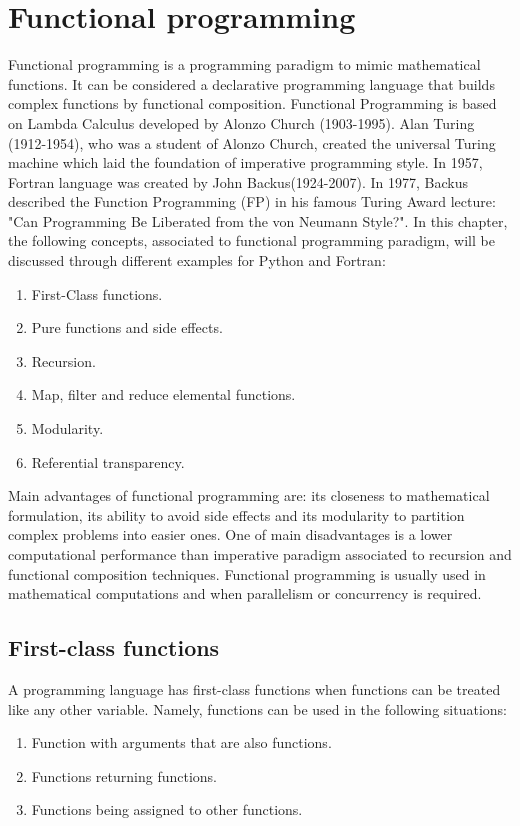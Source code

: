 \chapter{Functional programming} 
\vspace{-1cm}
Functional programming is a programming paradigm 
to mimic mathematical functions. 
It can be considered a declarative programming language 
that builds complex functions by functional composition. 
Functional Programming is based on Lambda Calculus developed 
by Alonzo Church (1903-1995). 
Alan Turing (1912-1954), who was a student of Alonzo Church, created the 
universal Turing machine which laid the foundation of imperative 
programming style.
In 1957, Fortran language was created by John Backus(1924-2007).
In 1977, Backus described the Function Programming (FP) in his famous Turing Award lecture:
 "Can Programming Be Liberated from the von Neumann Style?".
In this chapter, the following concepts, associated to functional 
programming paradigm, will be discussed through  different examples 
for Python and Fortran:  
\vspace{-0.25cm}
\begin{enumerate} 
 \setlength\itemsep{0cm}
\item First-Class functions.
\item Pure functions and side effects.
\item Recursion. 
\item Map, filter and reduce elemental functions.  
\item Modularity. 
\item Referential transparency. 
\end{enumerate} 
\vspace{-0.25cm}
Main advantages of functional programming are: its closeness 
to mathematical formulation, its ability to avoid side effects and 
its modularity to partition complex problems into easier ones.
One of main disadvantages is a lower  computational performance 
than imperative paradigm associated to recursion and functional composition
techniques.  Functional programming is usually used in mathematical 
computations and when parallelism or concurrency is required.


 
\newpage
 \section{First-class functions} 
A programming language has first-class functions 
when functions can be treated like any other variable. 
Namely, functions can be used in the following situations:  
\begin{enumerate} 
\item Function with arguments that are also functions.
\item Functions returning functions. 
\item Functions being assigned to other functions.
\end{enumerate} 

